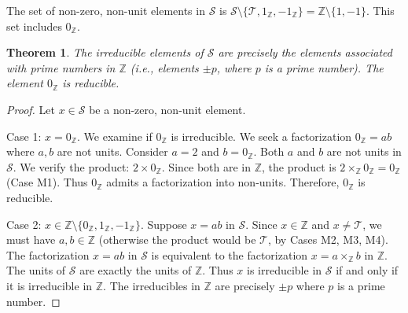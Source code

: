 \documentclass[11pt, a4paper]{article}
\theoremstyle{plain}
\newtheorem{theorem}{Theorem}[section]
\theoremstyle{definition}
\numberwithin{equation}{section}
\newcommand{\Z}{\mathbb{Z}}
\newcommand{\Tobj}{\mathcal{T}} %
\newcommand{\SemiringS}{\mathcal{S}}
\begin{document}
The set of non-zero, non-unit elements in $\SemiringS$ is $\SemiringS\setminus\{\Tobj, 1_{\Z}, -1_{\Z}\} = \Z\setminus\{1, -1\}$. This set includes $0_{\Z}$.

\begin{theorem}\label{thm:irreducibles_S}
The irreducible elements of $\SemiringS$ are precisely the elements associated with prime numbers in $\Z$ (i.e., elements $\pm p$, where $p$ is a prime number). The element $0_{\Z}$ is reducible.
\end{theorem}
\begin{proof}
Let $x \in \SemiringS$ be a non-zero, non-unit element.

Case 1: $x=0_{\Z}$. We examine if $0_{\Z}$ is irreducible. We seek a factorization $0_{\Z}=ab$ where $a, b$ are not units.
Consider $a=2$ and $b=0_{\Z}$. Both $a$ and $b$ are not units in $\SemiringS$.
We verify the product: $2\times 0_{\Z}$. Since both are in $\Z$, the product is $2\times_{\Z} 0_{\Z} = 0_{\Z}$ (Case M1).
Thus $0_{\Z}$ admits a factorization into non-units. Therefore, $0_{\Z}$ is reducible.

Case 2: $x \in \Z\setminus\{0_{\Z}, 1_{\Z}, -1_{\Z}\}$. Suppose $x=ab$ in $\SemiringS$.
Since $x\in\Z$ and $x\neq\Tobj$, we must have $a, b \in \Z$ (otherwise the product would be $\Tobj$, by Cases M2, M3, M4).
The factorization $x=ab$ in $\SemiringS$ is equivalent to the factorization $x=a\times_{\Z} b$ in $\Z$.
The units of $\SemiringS$ are exactly the units of $\Z$.
Thus $x$ is irreducible in $\SemiringS$ if and only if it is irreducible in $\Z$. The irreducibles in $\Z$ are precisely $\pm p$ where $p$ is a prime number.
\end{proof}
\end{document}
